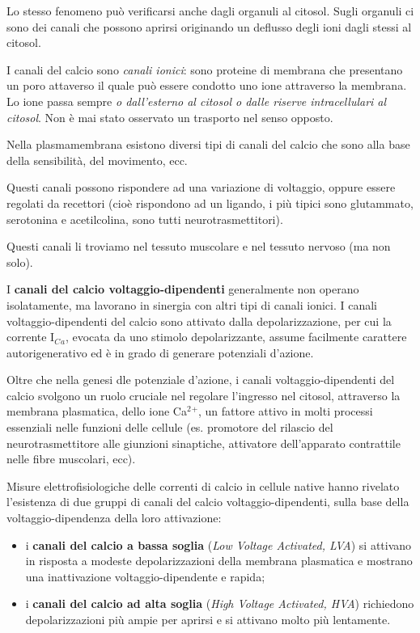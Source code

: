 \documentclass[]{article}
\begin{document}
Lo stesso fenomeno può verificarsi anche dagli organuli al citosol.
Sugli organuli ci sono dei canali che possono aprirsi originando un
deflusso degli ioni dagli stessi al citosol.

I canali del calcio sono \emph{canali ionici}: sono proteine di membrana
che presentano un poro attaverso il quale può essere condotto uno ione
attraverso la membrana. Lo ione passa sempre \emph{o dall'esterno al
citosol o dalle riserve intracellulari al citosol}. Non è mai stato
osservato un trasporto nel senso opposto.

Nella plasmamembrana esistono diversi tipi di canali del calcio che sono
alla base della sensibilità, del movimento, ecc.

Questi canali possono rispondere ad una variazione di voltaggio, oppure
essere regolati da recettori (cioè rispondono ad un ligando, i più
tipici sono glutammato, serotonina e acetilcolina, sono tutti
neurotrasmettitori).

Questi canali li troviamo nel tessuto muscolare e nel tessuto nervoso
(ma non solo).

I \textbf{canali del calcio voltaggio-dipendenti} generalmente non
operano isolatamente, ma lavorano in sinergia con altri tipi di canali
ionici. I canali voltaggio-dipendenti del calcio sono attivato dalla
depolarizzazione, per cui la corrente I\(_C\)\(_a\), evocata da uno
stimolo depolarizzante, assume facilmente carattere autorigenerativo ed
è in grado di generare potenziali d'azione.

Oltre che nella genesi dle potenziale d'azione, i canali
voltaggio-dipendenti del calcio svolgono un ruolo cruciale nel regolare
l'ingresso nel citosol, attraverso la membrana plasmatica, dello ione
Ca\(^2\)\(^+\), un fattore attivo in molti processi essenziali nelle
funzioni delle cellule (es. promotore del rilascio del
neurotrasmettitore alle giunzioni sinaptiche, attivatore dell'apparato
contrattile nelle fibre muscolari, ecc).

Misure elettrofisiologiche delle correnti di calcio in cellule native
hanno rivelato l'esistenza di due gruppi di canali del calcio
voltaggio-dipendenti, sulla base della voltaggio-dipendenza della loro
attivazione:

\begin{itemize}
\itemsep1pt\parskip0pt
\item
  i \textbf{canali del calcio a bassa soglia} (\emph{Low Voltage
  Activated, LVA}) si attivano in risposta a modeste depolarizzazioni
  della membrana plasmatica e mostrano una inattivazione
  voltaggio-dipendente e rapida;
\item
  i \textbf{canali del calcio ad alta soglia} (\emph{High Voltage
  Activated, HVA}) richiedono depolarizzazioni più ampie per aprirsi e
  si attivano molto più lentamente.
\end{itemize}
\end{document}
